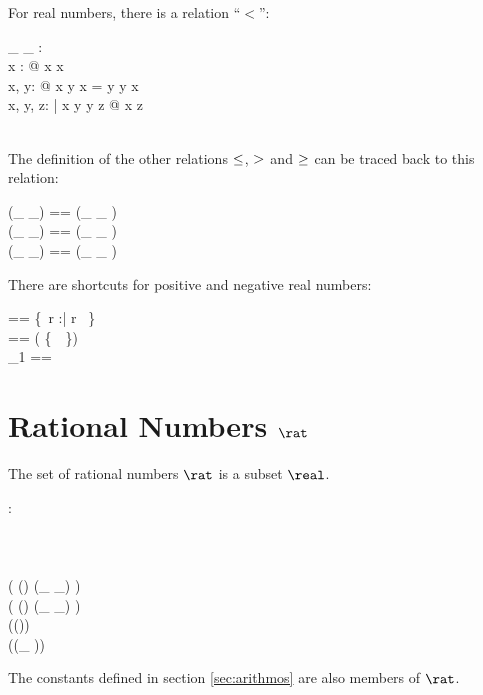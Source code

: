 \documentclass[12pt]{article}
\begin{document}
For real numbers, there is a relation ``$<$'':
%
\begin{axdef}
  \_ \alt \_ : \real \rel \real\\
  \where
  \forall x : \real @ \lnot x \alt x\\
  \forall x, y: \real @ x \alt y \lor x = y \lor y \alt x\\
  \forall x, y, z: \real | x \alt y \land y \alt z @ x \alt z \\
  \azero \alt \aone\\
\end{axdef}
%
The definition of the other relations $\leq$, $>$ and $\geq$ can
be traced back to this relation:
%
\begin{zed}
  (\_ \aleq \_) == (\_ \alt \_ ) \cup \id \real \\
  (\_ \agt \_) == (\_ \alt \_ ) \inv \\
  (\_ \ageq \_) == (\_ \agt \_ ) \cup \id \real \\
\end{zed}
%
There are shortcuts for positive and negative real numbers:
%
\begin{zed}
  \realplus == \{~r :\real | r \agt \azero~\}\\
  \realminus == \real \setminus ( \realplus \cup \{~\azero~\})\\
  \real_1 == \realplus \cup \realminus \\
\end{zed}
%
%

%
\section{Rational Numbers $\rat$}
\label{sec:rational-numbers}
The set of rational numbers $\rat$ is a subset $\real$.
%
\begin{axdef}
  \rat : \power \real
  \where
  \azero \in \rat\\
  \aone \in \rat\\
  \atwo \in \rat\\
  \aten \in \rat\\
  \ran ( (\rat \cross \rat) \dres (\_ \aplus \_) ) \subset \rat\\
  \ran ( (\rat \cross \rat) \dres (\_ \amult \_) ) \subset \rat\\
  \ran (\rat \dres (\aneg ))  \subset \rat\\
  \ran (\rat \dres (\_ \ainv ))  \subset \rat\\
\end{axdef}
The constants defined in section \ref{sec:arithmos} are also members
of $\rat$.
\end{document}
